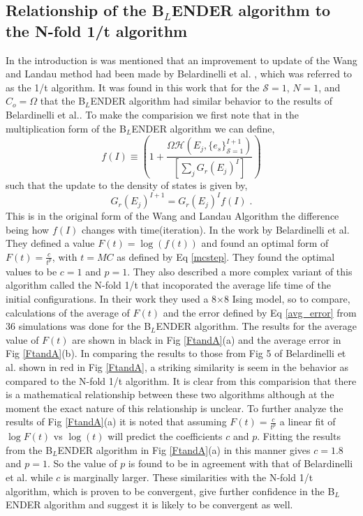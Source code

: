 \documentclass[aps,prl,reprint,superscriptaddress,showkeys]{revtex4-1}
\begin{document}
\subsection{Relationship of the B$_L$ENDER algorithm to the N-fold 1/t algorithm}
In the introduction is was mentioned that an improvement to update of the Wang and Landau method had been made by Belardinelli et al. \cite{saturation}, which was referred to as the 1/t algorithm. It was found in this work that for the $\mathcal{S}=1$, $N=1$, and $C_{o}=\Omega$ that the B$_L$ENDER algorithm had similar behavior to the results of Belardinelli et al.. To make the comparision we first note that in the multiplication form of the B$_L$ENDER algorithm we can define, 
\begin{equation}
f(I) \equiv ( 1 +  \frac{\Omega \mathcal{H}(E_j,\{e_s\}_{\mathcal{S}=1}^{I+1}) }{ [\sum_j G_{r}(E_j)^{I}] } )  
\label{fequiv}
\end{equation}
such that the update to the density of states is given by,
\begin{equation}
G_{r}(E_j)^{I+1} = G_{r}(E_j)^{I}f(I)\;.
\label{orignialform}
\end{equation}
This is in the original form of the Wang and Landau Algorithm the difference being how $f(I)$ changes with time(iteration). In the work by Belardinelli et al. They defined a value $F(t) = \log(f(t))$  and found an optimal form of $F(t) = \frac{c}{t^p}$, with $t=MC$ as defined by Eq \ref{mcstep}. They found the optimal values to be $c=1$ and $p=1$. They also described a more complex variant of this algorithm called the N-fold 1/t  that incoporated the average life time of the initial configurations. In their work they used a 8$\times$8 Ising model, so to compare, calculations of the average of $F(t)$ and the error defined by Eq \ref{avg_error} from 36 simulations was done for the B$_L$ENDER algorithm. The results for the average value of $F(t)$ are shown in black in Fig \ref{FtandA}(a) and the average error in Fig \ref{FtandA}(b). In comparing the results to those from Fig 5 of Belardinelli et al. \cite{saturation} shown in red in Fig \ref{FtandA}, a striking similarity is seem in the behavior as compared to the N-fold 1/t algorithm. It is clear from this comparision that there is a mathematical relationship between these two algorithms although at the moment the exact nature of this relationship is unclear.  To further analyze the results of  Fig \ref{FtandA}(a) it is noted that assuming $F(t) = \frac{c}{t^p}$  a linear fit of  $\log F(t)$ vs $\log(t)$ will predict the coefficients $c$ and $p$. Fitting the results from the B$_L$ENDER algorithm in Fig \ref{FtandA}(a) in this manner gives $c=1.8$ and $p=1$. So the value of $p$ is found to be in agreement with that of Belardinelli et al. while $c$ is marginally larger. These similarities with the N-fold 1/t algorithm, which is proven to be convergent, give further confidence in the B$_L$ENDER algorithm and suggest it is likely to be convergent as well. 
\end{document}
